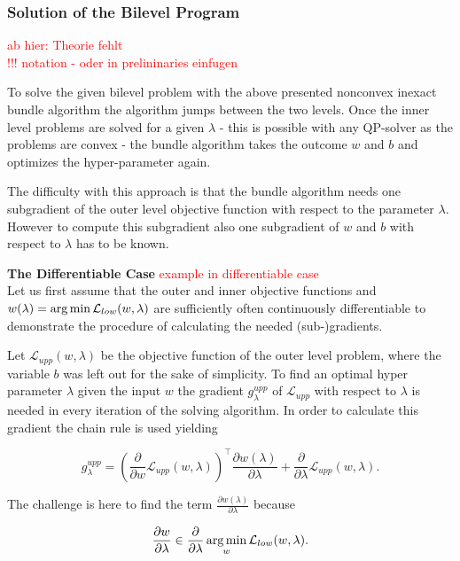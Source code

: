 \subsubsection{Solution of the Bilevel Program}

\textcolor{red}{ab hier: Theorie fehlt\\
!!! notation - oder in prelininaries einfugen}

To solve the given bilevel problem with the above presented nonconvex inexact bundle algorithm the algorithm jumps between the two levels. Once the inner level problems are solved for a given \(\lambda\) - this is possible with any QP-solver as the problems are convex - the bundle algorithm takes the outcome \(w\) and \(b\) and optimizes the hyper-parameter again.

The difficulty with this approach is that the bundle algorithm needs one subgradient of the outer level objective function with respect to the parameter \(\lambda\). However to compute this subgradient also one subgradient of \(w\) and \(b\) with respect to \(\lambda\) has to be known.

\textbf{The Differentiable Case}
\textcolor{red}{example in differentiable case}\\
Let us first assume that the outer and inner objective functions and \(w(\lambda)= \operatorname*{arg\,min} \mathcal{L}_{low}(w,\lambda)\) are sufficiently often continuously differentiable to demonstrate the procedure of calculating the needed {(sub-)gradients}.

Let \(\mathcal{L}_{upp}(w,\lambda)\) be the objective function of the outer level problem, where the variable \(b\) was left out for the sake of simplicity.
To find an optimal hyper parameter \(\lambda\) given the input \(w\) the gradient \(g^{upp}_{\lambda}\) of \(\mathcal{L}_{upp}\) with respect to \(\lambda\) is needed in every iteration of the solving algorithm.
In order to calculate this gradient the chain rule is used yielding

\begin{equation*}
	g^{upp}_{\lambda} = \left(\frac{\partial}{\partial w}\mathcal{L}_{upp}(w,\lambda) \right)^{\top}\frac{\partial w(\lambda)}{\partial\lambda}+\frac{\partial}{\partial \lambda}\mathcal{L}_{upp}(w,\lambda).
\end{equation*}

The challenge is here to find the term \(\frac{\partial w(\lambda)}{\partial\lambda}\) because 

\[ \frac{\partial w}{\partial \lambda} \in \frac{\partial }{\partial \lambda} \operatorname*{arg\,min}_{w} \mathcal{L}_{low}(w,\lambda). \]

